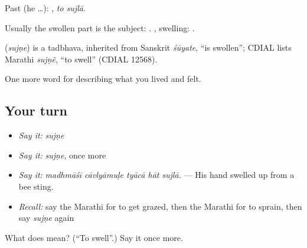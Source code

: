Past (he …):  , \emph{to sujlā}.

Usually the swollen part is the subject:   . , swelling:  .

\begin{cousinweb}
\textbf{} (\emph{sujṇe}) is a tadbhava, inherited from Sanskrit \emph{śūyate}, \textquotedblleft{}is swollen\textquotedblright{}; CDIAL lists Marathi \emph{sujṇẽ}, \textquotedblleft{}to swell\textquotedblright{} (CDIAL 12568).
\end{cousinweb}

\begin{grammarlens}[title={What you've built}]
One more word for describing what you lived and felt.
\end{grammarlens}

\subsection*{Your turn}
\begin{itemize}
\raggedright
  \item \emph{Say it:} \emph{sujṇe}
  \item \emph{Say it:} \emph{sujṇe}, once more
  \item \emph{Say it:} \emph{madhmāśī cāvlyāmuḷe tyācā hāt sujlā.} — His hand swelled up from a bee sting.
  \item \emph{Recall:} say the Marathi for to get grazed, then the Marathi for to sprain, then say \emph{sujṇe} again
\end{itemize}

\begin{tcolorbox}[breakable,colback=teal!4,colframe=teal!35!black,title={Before you move on}]
What does  mean? (\textquotedblleft{}To swell\textquotedblright{}.) Say it once more.
\end{tcolorbox}
